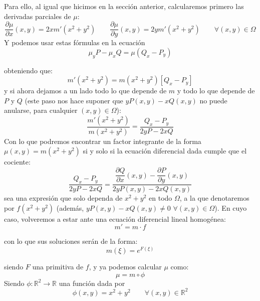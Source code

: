 Para ello, al igual que hicimos en la sección anterior, calcularemos primero las derivadas parciales de $\mu$:
\begin{equation*}
    \dfrac{\partial \mu}{\partial x}(x,y) = 2xm'(x^2+y^2) \qquad \dfrac{\partial \mu}{\partial y}(x,y) = 2ym'(x^2+y^2) \qquad \forall (x,y)\in \Omega
\end{equation*}
Y podemos usar estas fórmulas en la ecuación
\begin{equation*}
    \mu_y P - \mu_x Q = \mu(Q_x-P_y)
\end{equation*}

obteniendo que:
\begin{equation*}
    [2yP-2xQ]m'(x^2+y^2) = m(x^2+y^2)[Q_x-P_y]
\end{equation*}
y si ahora dejamos a un lado todo lo que depende de $m$ y todo lo que depende de $P$ y $Q$ (este paso nos hace suponer que $yP(x,y)-xQ(x,y)$ no puede anularse, para cualquier $(x,y)\in \Omega$): 
\begin{equation*}
    \dfrac{m'(x^2+y^2)}{m(x^2+y^2)} = \dfrac{Q_x-P_y}{2yP-2xQ}
\end{equation*}
Con lo que podremos encontrar un factor integrante de la forma $\mu(x,y)=m(x^2+y^2)$ si y solo si la ecuación diferencial dada cumple que el cociente:
\begin{equation*}
     \dfrac{Q_x-P_y}{2yP-2xQ} = \dfrac{\dfrac{\partial Q}{\partial x}(x,y)-\dfrac{\partial P}{\partial y}(x,y)}{2yP(x,y)-2xQ(x,y)} 
\end{equation*}
sea una expresión que solo dependa de $x^2+y^2$ en todo $\Omega$, a la que denotaremos por $f(x^2+y^2)$ (además, $yP(x,y)-xQ(x,y)\neq 0$ $\forall (x,y)\in \Omega$). En cuyo caso, volveremos a estar ante una ecuación diferencial lineal homogénea:
\begin{equation*}
    m' = m\cdot f
\end{equation*}

con lo que sus soluciones serán de la forma:
\begin{equation*}
    m(\xi) = e^{F(\xi)}
\end{equation*}

siendo $F$ una primitiva de $f$, y ya podemos calcular $\mu$ como:
\begin{equation*}
    \mu = m \circ \phi
\end{equation*}
Siendo $\phi:\mathbb{R}^2\rightarrow\mathbb{R}$ una función dada por
\begin{equation*}
    \phi(x,y) = x^2+y^2 \qquad \forall (x,y)\in \mathbb{R}^2
\end{equation*}

